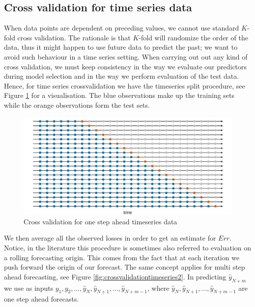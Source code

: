 \subsection{Cross validation for time series data}
When data points are dependent on preceding values, we cannot use standard $K$-fold cross validation. The rationale is that $K$-fold will randomize the order of the data, thus it might happen to use future data to predict the past; we want to avoid such behaviour in a time series setting. 
When carrying out out any kind of cross validation, we must keep consistency in the way we evaluate our predictors during model selection and in the way we perform evaluation of the test data.
Hence, for time series crossvalidation we have the timeseries split procedure, see Figure \ref{fig:crossvalidationtimeseries} for a visualisation. The blue observations make up the training sets while the orange observations form the test sets.
\begin{figure}
    \includegraphics[width=\textwidth]{images/crossvalidationtimeseries.png}
    \caption{Cross validation for one step ahead timeseries data \cite{hyndman2018forecasting}}
    \label{fig:crossvalidationtimeseries}
\end{figure}
We then average all the observed losses in order to get an estimate for $Err$.
Notice, in the literature this procedure is sometimes also referred to evaluation on a rolling forecasting origin. This comes from the fact that at each iteration we push forward the origin of our forecast.
The same concept applies for multi step ahead forecasting, see Figure \ref{fig:crossvalidationtimeseries2}.
In predicting $\hat{y}_{N+m}$ we use as inputs $y_1, y_2, \dots, \hat{y}_{N},\hat{y}_{N+1},\dots, \hat{y}_{N+m-1}$, where $\hat{y}_{N},\hat{y}_{N+1},\dots, \hat{y}_{N+m-1}$ are one step ahead forecasts.
